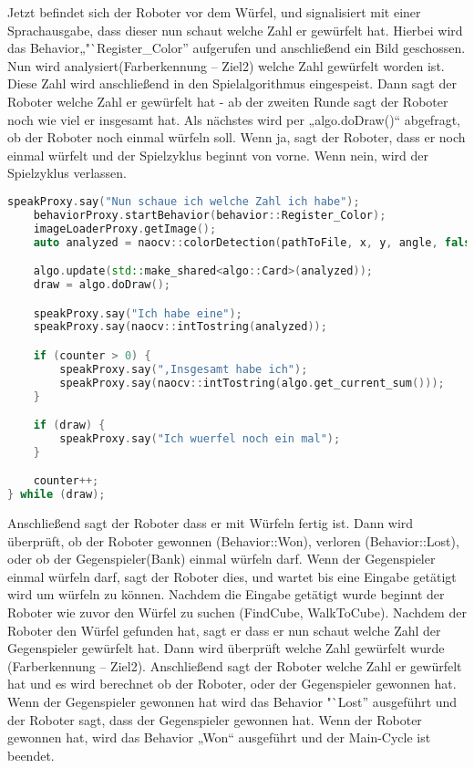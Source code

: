         Jetzt befindet sich der Roboter vor dem Würfel, und signalisiert mit
        einer Sprachausgabe, dass dieser nun schaut welche Zahl er gewürfelt
        hat.
        Hierbei wird das Behavior„"`Register\_Color'' aufgerufen und
        anschließend ein Bild geschossen.
        Nun wird analysiert(Farberkennung – Ziel2) welche Zahl gewürfelt worden
        ist.
        Diese Zahl wird anschließend in den Spielalgorithmus eingespeist.
        Dann sagt der Roboter welche Zahl er gewürfelt hat - ab der zweiten
        Runde sagt der Roboter noch wie viel er insgesamt hat.
        Als nächstes wird per „algo.doDraw()“ abgefragt, ob der Roboter noch
        einmal würfeln soll.
        Wenn ja, sagt der Roboter, dass er noch einmal würfelt und der
        Spielzyklus beginnt von vorne.
        Wenn nein, wird der Spielzyklus verlassen.


\begin{lstlisting}[language=c++,
                   caption={Mainloop, Teil 5},
                   label={lst:main5}]
    speakProxy.say("Nun schaue ich welche Zahl ich habe");
    behaviorProxy.startBehavior(behavior::Register_Color);
    imageLoaderProxy.getImage();
    auto analyzed = naocv::colorDetection(pathToFile, x, y, angle, false);

    algo.update(std::make_shared<algo::Card>(analyzed));
    draw = algo.doDraw();

    speakProxy.say("Ich habe eine");
    speakProxy.say(naocv::intTostring(analyzed));

    if (counter > 0) {
        speakProxy.say(",Insgesamt habe ich");
        speakProxy.say(naocv::intTostring(algo.get_current_sum()));
    }

    if (draw) {
        speakProxy.say("Ich wuerfel noch ein mal");
    }

    counter++;
} while (draw);

\end{lstlisting}

        Anschließend sagt der Roboter dass er mit Würfeln fertig ist.
        Dann wird überprüft, ob der Roboter gewonnen (Behavior::Won), verloren
        (Behavior::Lost), oder ob der Gegenspieler(Bank) einmal würfeln darf.
        Wenn der Gegenspieler einmal würfeln darf, sagt der Roboter dies, und
        wartet bis eine Eingabe getätigt wird um würfeln zu können.
        Nachdem die Eingabe getätigt wurde beginnt der Roboter wie zuvor den
        Würfel zu suchen (FindCube, WalkToCube).
        Nachdem der Roboter den Würfel gefunden hat, sagt er dass er nun schaut
        welche Zahl der Gegenspieler gewürfelt hat.
        Dann wird überprüft welche Zahl gewürfelt wurde (Farberkennung – Ziel2).
        Anschließend sagt der Roboter welche Zahl er gewürfelt hat und es wird
        berechnet ob der Roboter, oder der Gegenspieler gewonnen hat.
        Wenn der Gegenspieler gewonnen hat wird das Behavior "`Lost'' ausgeführt
        und der Roboter sagt, dass der Gegenspieler gewonnen hat.
        Wenn der Roboter gewonnen hat, wird das Behavior „Won“ ausgeführt und
        der Main-Cycle ist beendet.

